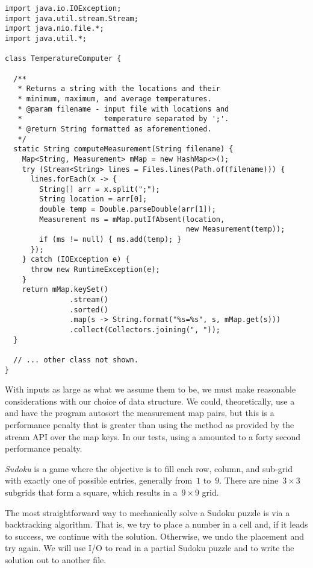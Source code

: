 \begin{lstlisting}[language=MyJava]
import java.io.IOException;
import java.util.stream.Stream;
import java.nio.file.*;
import java.util.*;

class TemperatureComputer {

  /**
   * Returns a string with the locations and their 
   * minimum, maximum, and average temperatures.
   * @param filename - input file with locations and 
   *                   temperature separated by ';'.
   * @return String formatted as aforementioned.
   */
  static String computeMeasurement(String filename) {
    Map<String, Measurement> mMap = new HashMap<>();
    try (Stream<String> lines = Files.lines(Path.of(filename))) {
      lines.forEach(x -> {
        String[] arr = x.split(";");
        String location = arr[0];
        double temp = Double.parseDouble(arr[1]);
        Measurement ms = mMap.putIfAbsent(location, 
                                          new Measurement(temp));
        if (ms != null) { ms.add(temp); }
      });
    } catch (IOException e) {
      throw new RuntimeException(e);
    }
    return mMap.keySet()
               .stream()
               .sorted()
               .map(s -> String.format("%s=%s", s, mMap.get(s)))
               .collect(Collectors.joining(", "));
  }

  // ... other class not shown.
}
\end{lstlisting}

With inputs as large as what we assume them to be, we must make reasonable considerations with our choice of data structure. 
We could, theoretically, use a  and have the program autosort the measurement map pairs, but this is a performance penalty that is greater than using the  method as provided by the stream API over the map keys. 
In our tests, using a  amounted to a forty second performance penalty.

\emph{Sudoku} is a game where the objective is to fill each row, column, and sub-grid with exactly one of possible entries, generally from~$1$ to~$9$. 
There are nine~$3\times{3}$ subgrids that form a square, which results in a~$9\times{9}$ grid.

The most straightforward way to mechanically solve a Sudoku puzzle is via a backtracking algorithm. 
That is, we try to place a number in a cell and, if it leads to success, we continue with the solution. 
Otherwise, we undo the placement and try again.
We will use I/O to read in a partial Sudoku puzzle and to write the solution out to another file.

